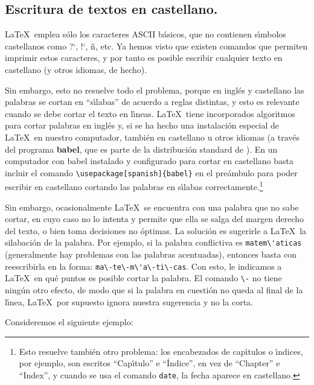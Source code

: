 \subsection{Escritura de textos en castellano.}

\LaTeX\ emplea s{\'o}lo los caracteres ASCII b{\'a}sicos, que no contienen
s\'{\i}mbolos castellanos como ?`, !`, {\~n}, etc. Ya hemos visto que existen
comandos que permiten imprimir estos caracteres, y por tanto es
posible escribir cualquier texto en castellano (y otros idiomas, de
hecho).

Sin embargo, esto no resuelve todo el problema, porque en ingl{\'e}s y
castellano las palabras se cortan en ``s{\'\i}labas'' de acuerdo a reglas
distintas, y esto es relevante cuando se debe cortar el texto en
l{\'\i}neas. \LaTeX\ tiene incorporados algoritmos para cortar palabras en
ingl{\'e}s y, si se ha hecho una instalaci{\'o}n especial de \LaTeX\ en
nuestro computador, tambi{\'e}n en castellano u otros idiomas (a trav{\'e}s
del programa {\bf babel}, que es parte de la distribuci{\'o}n standard de
\LaTeXe). En un computador con babel instalado y configurado para
cortar en castellano basta incluir el comando
\verb|\usepackage[spanish]{babel}| en el pre{\'a}mbulo para poder escribir
en castellano cortando las palabras en s{\'\i}labas
correctamente.\footnote{Esto resuelve tambi\'en otro problema:
  los encabezados de cap\'{\i}tulos o \'{\i}ndices, por ejemplo, son
  escritos ``Cap\'{\i}tulo'' e ``\'Indice'', en vez de ``Chapter'' e
  ``Index'', y cuando se usa el comando {\tt \bslash date}, la fecha aparece
  en castellano.}

Sin embargo, ocasionalmente \LaTeX\ se encuentra con una palabra que
no sabe cortar, en cuyo caso no lo intenta y permite que ella se salga
del margen derecho del texto, o bien toma decisiones no {\'o}ptimas. La
soluci{\'o}n es sugerirle a \LaTeX\ la silabaci{\'o}n de la palabra. Por
ejemplo, si la palabra conflictiva es \verb+matem\'aticas+ (generalmente
hay problemas con las palabras acentuadas), entonces basta con
reescribirla en la forma: \verb+ma\-te\-m\'a\-ti\-cas+. Con esto, le
indicamos a \LaTeX\ en qu{\'e} puntos es posible cortar la palabra. El
comando \verb+\-+ no tiene ning{\'u}n otro efecto, de modo que si la
palabra en cuesti{\'o}n no queda al final de la l{\'\i}nea, \LaTeX\ por
supuesto ignora nuestra sugerencia y no la corta.

Consideremos el siguiente ejemplo:

